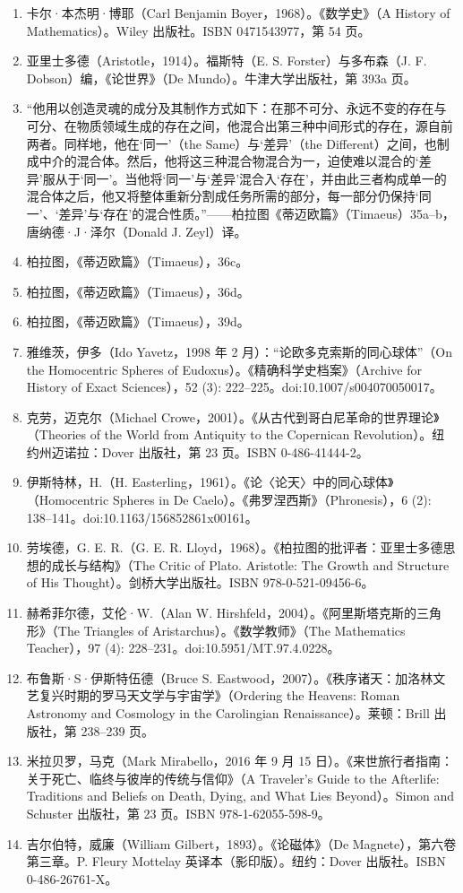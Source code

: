 \begin{enumerate}
\item 卡尔·本杰明·博耶（Carl Benjamin Boyer，1968）。《数学史》（A History of Mathematics）。Wiley 出版社。ISBN 0471543977，第 54 页。  
\item 亚里士多德（Aristotle，1914）。福斯特（E. S. Forster）与多布森（J. F. Dobson）编，《论世界》（De Mundo）。牛津大学出版社，第 393a 页。  
\item “他用以创造灵魂的成分及其制作方式如下：在那不可分、永远不变的存在与可分、在物质领域生成的存在之间，他混合出第三种中间形式的存在，源自前两者。同样地，他在‘同一’（the Same）与‘差异’（the Different）之间，也制成中介的混合体。然后，他将这三种混合物混合为一，迫使难以混合的‘差异’服从于‘同一’。当他将‘同一’与‘差异’混合入‘存在’，并由此三者构成单一的混合体之后，他又将整体重新分割成任务所需的部分，每一部分仍保持‘同一’、‘差异’与‘存在’的混合性质。”——柏拉图《蒂迈欧篇》（Timaeus）35a–b，唐纳德·J·泽尔（Donald J. Zeyl）译。  
\item 柏拉图，《蒂迈欧篇》（Timaeus），36c。  
\item 柏拉图，《蒂迈欧篇》（Timaeus），36d。  
\item 柏拉图，《蒂迈欧篇》（Timaeus），39d。  
\item 雅维茨，伊多（Ido Yavetz，1998 年 2 月）：“论欧多克索斯的同心球体”（On the Homocentric Spheres of Eudoxus）。《精确科学史档案》（Archive for History of Exact Sciences），52 (3): 222–225。doi:10.1007/s004070050017。  
\item 克劳，迈克尔（Michael Crowe，2001）。《从古代到哥白尼革命的世界理论》（Theories of the World from Antiquity to the Copernican Revolution）。纽约州迈诺拉：Dover 出版社，第 23 页。ISBN 0-486-41444-2。  
\item 伊斯特林，H.（H. Easterling，1961）。《论〈论天〉中的同心球体》（Homocentric Spheres in De Caelo）。《弗罗涅西斯》（Phronesis），6 (2): 138–141。doi:10.1163/156852861x00161。  
\item 劳埃德，G. E. R.（G. E. R. Lloyd，1968）。《柏拉图的批评者：亚里士多德思想的成长与结构》（The Critic of Plato. Aristotle: The Growth and Structure of His Thought）。剑桥大学出版社。ISBN 978-0-521-09456-6。  
\item 赫希菲尔德，艾伦·W.（Alan W. Hirshfeld，2004）。《阿里斯塔克斯的三角形》（The Triangles of Aristarchus）。《数学教师》（The Mathematics Teacher），97 (4): 228–231。doi:10.5951/MT.97.4.0228。  
\item 布鲁斯·S·伊斯特伍德（Bruce S. Eastwood，2007）。《秩序诸天：加洛林文艺复兴时期的罗马天文学与宇宙学》（Ordering the Heavens: Roman Astronomy and Cosmology in the Carolingian Renaissance）。莱顿：Brill 出版社，第 238–239 页。  
\item 米拉贝罗，马克（Mark Mirabello，2016 年 9 月 15 日）。《来世旅行者指南：关于死亡、临终与彼岸的传统与信仰》（A Traveler’s Guide to the Afterlife: Traditions and Beliefs on Death, Dying, and What Lies Beyond）。Simon and Schuster 出版社，第 23 页。ISBN 978-1-62055-598-9。  
\item 吉尔伯特，威廉（William Gilbert，1893）。《论磁体》（De Magnete），第六卷第三章。P. Fleury Mottelay 英译本（影印版）。纽约：Dover 出版社。ISBN 0-486-26761-X。
\end{enumerate}


